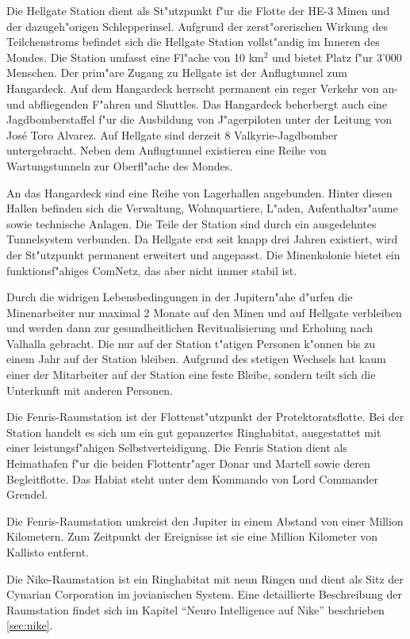 Die Hellgate Station dient als St"utzpunkt f"ur die Flotte der HE-3 Minen und der dazugeh"origen Schlepperinsel. Aufgrund der zerst"orerischen Wirkung des Teilchenstroms befindet sich die Hellgate Station vollst"andig im Inneren des Mondes. Die Station umfasst eine Fl"ache von 10 km$^{2}$ und bietet Platz f"ur 3'000 Menschen. Der prim"are Zugang zu Hellgate ist der Anflugtunnel zum Hangardeck. Auf dem Hangardeck herrscht permanent ein reger Verkehr von an- und abfliegenden F"ahren und Shuttles. Das Hangardeck beherbergt auch eine Jagdbomberstaffel f"ur die Ausbildung von J"agerpiloten unter der Leitung von Jos\'{e} \frqq{}Toro\flqq{} Alvarez. Auf Hellgate sind derzeit 8 Valkyrie-Jagdbomber untergebracht. Neben dem Anflugtunnel existieren eine Reihe von Wartungstunneln zur Oberfl"ache des Mondes.

An das Hangardeck sind eine Reihe von Lagerhallen angebunden. Hinter diesen Hallen befinden sich die Verwaltung, Wohnquartiere, L"aden, Aufenthaltsr"aume sowie technische Anlagen. Die Teile der Station sind durch ein ausgedehntes Tunnelsystem verbunden. Da Hellgate erst seit knapp drei Jahren existiert, wird der St"utzpunkt permanent erweitert und angepasst. Die Minenkolonie bietet ein funktionsf"ahiges ComNetz, das aber nicht immer stabil ist.

Durch die widrigen Lebensbedingungen in der Jupitern"ahe d"urfen die Minenarbeiter nur maximal 2 Monate auf den Minen und auf Hellgate verbleiben und werden dann zur gesundheitlichen Revitualisierung und Erholung nach Valhalla gebracht. Die nur auf der Station t"atigen Personen k"onnen bis zu einem Jahr auf der Station bleiben. Aufgrund des stetigen Wechsels hat kaum einer der Mitarbeiter auf der Station eine feste Bleibe, sondern teilt sich die Unterkunft mit anderen Personen.

Die Fenris-Raumstation ist der Flottenst"utzpunkt der Protektoratsflotte. Bei der Station handelt es sich um ein gut gepanzertes Ringhabitat, ausgestattet mit einer leistungsf"ahigen Selbstverteidigung. Die Fenris Station dient als Heimathafen f"ur die beiden Flottentr"ager Donar und Martell sowie deren Begleitflotte. Das Habiat steht unter dem Kommando von Lord Commander Grendel.

Die Fenris-Raumstation umkreist den Jupiter in einem Abstand von einer Million Kilometern. Zum Zeitpunkt der Ereignisse ist sie eine Million Kilometer von Kallisto entfernt.


Die Nike-Raumstation ist ein Ringhabitat mit neun Ringen und dient als Sitz der Cynarian Corporation im jovianischen System. Eine detaillierte Beschreibung der Raumstation findet sich im Kapitel ``Neuro Intelligence auf Nike'' beschrieben \cref{sec:nike}.

